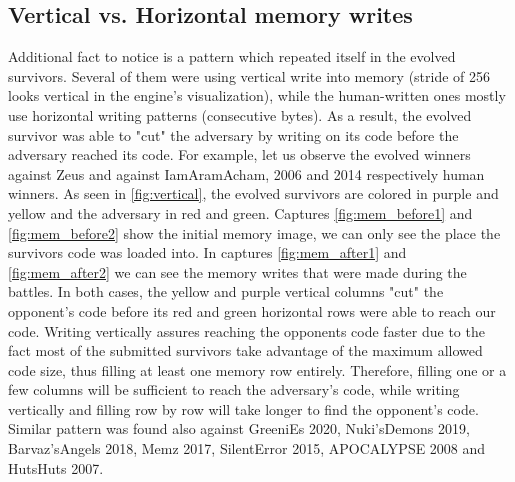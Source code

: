 \documentclass[dvipsnames,format=sigconf,anonymous=true,review=true]{acmart}
\begin{document}
\subsection{Vertical vs. Horizontal memory writes}
Additional fact to notice is a pattern which repeated itself in the evolved survivors. Several of them were using vertical write into memory (stride of 256 looks vertical in the engine's visualization), while the human-written ones mostly use horizontal writing patterns (consecutive bytes). As a result, the evolved survivor was able to "cut" the adversary by writing on its code before the adversary reached its code. For example, let us observe the evolved winners against Zeus and against IamAramAcham, 2006 and 2014 respectively human winners. As seen in \autoref{fig:vertical}, the evolved survivors are colored in purple and yellow and the adversary in red and green. Captures \autoref{fig:mem_before1} and \autoref{fig:mem_before2} show the initial memory image, we can only see the place the survivors code was loaded into. In captures \autoref{fig:mem_after1} and \autoref{fig:mem_after2} we can see the memory writes that were made during the battles. In both cases, the yellow and purple vertical columns "cut" the opponent's code before its red and green horizontal rows were able to reach our code. Writing vertically assures reaching the opponents code faster due to the fact most of the submitted survivors take advantage of the maximum allowed code size, thus filling at least one memory row entirely. Therefore, filling one or a few columns will be sufficient to reach the adversary's code, while writing vertically and filling row by row will take longer to find the opponent's code. Similar pattern was found also against GreeniEs 2020, Nuki’sDemons 2019, Barvaz'sAngels 2018, Memz 2017, SilentError 2015, APOCALYPSE 2008 and HutsHuts 2007.
\end{document}
